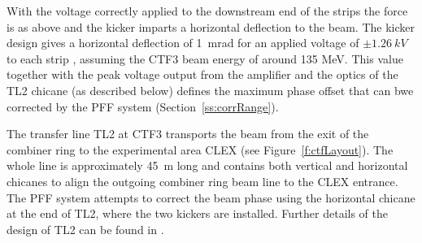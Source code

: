 With the voltage correctly applied to the downstream end of the strips the force is as above and the kicker imparts a horizontal deflection to the beam. The kicker design gives a horizontal deflection of 1~mrad for an applied voltage of \(\pm1.26~kV\) to each strip \cite{kickerIPAC11}, assuming the CTF3 beam energy of around 135 MeV. This value together with the peak voltage output from the amplifier and the optics of the TL2 chicane (as described below) defines the maximum phase offset that can bwe corrected by the PFF system (Section~\ref{ss:corrRange}).




The transfer line TL2 at CTF3 transports the beam from the exit of the combiner ring to the experimental area CLEX (see Figure~\ref{f:ctfLayout}). The whole line is approximately 45~m long and contains both vertical and horizontal chicanes to align the outgoing combiner ring beam line to the CLEX entrance. The PFF system attempts to correct the beam phase using the horizontal chicane at the end of TL2, where the two kickers are installed. Further details of the design of TL2 can be found in \cite{tl2}.



